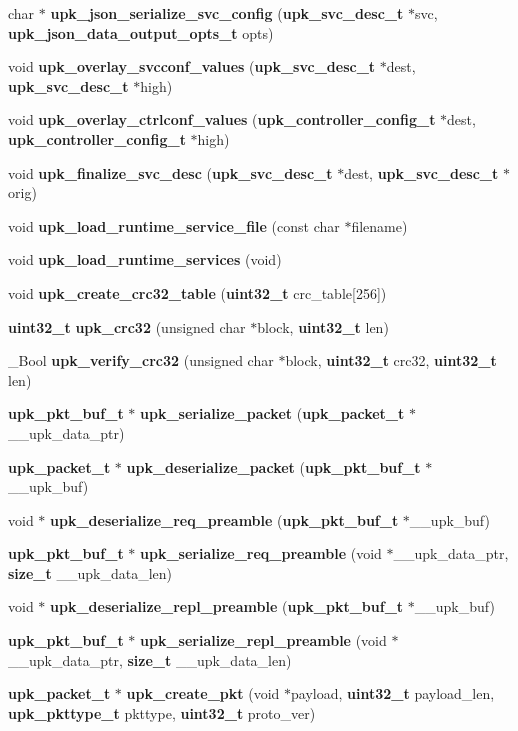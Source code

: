 \begin{DoxyCompactItemize}
\item 
char $\ast$ {\bf upk\_\-json\_\-serialize\_\-svc\_\-config} ({\bf upk\_\-svc\_\-desc\_\-t} $\ast$svc, {\bf upk\_\-json\_\-data\_\-output\_\-opts\_\-t} opts)
\item 
void {\bf upk\_\-overlay\_\-svcconf\_\-values} ({\bf upk\_\-svc\_\-desc\_\-t} $\ast$dest, {\bf upk\_\-svc\_\-desc\_\-t} $\ast$high)
\item 
void {\bf upk\_\-overlay\_\-ctrlconf\_\-values} ({\bf upk\_\-controller\_\-config\_\-t} $\ast$dest, {\bf upk\_\-controller\_\-config\_\-t} $\ast$high)
\item 
void {\bf upk\_\-finalize\_\-svc\_\-desc} ({\bf upk\_\-svc\_\-desc\_\-t} $\ast$dest, {\bf upk\_\-svc\_\-desc\_\-t} $\ast$orig)
\item 
void {\bf upk\_\-load\_\-runtime\_\-service\_\-file} (const char $\ast$filename)
\item 
void {\bf upk\_\-load\_\-runtime\_\-services} (void)
\item 
void {\bf upk\_\-create\_\-crc32\_\-table} ({\bf uint32\_\-t} crc\_\-table[256])
\item 
{\bf uint32\_\-t} {\bf upk\_\-crc32} (unsigned char $\ast$block, {\bf uint32\_\-t} len)
\item 
\_\-Bool {\bf upk\_\-verify\_\-crc32} (unsigned char $\ast$block, {\bf uint32\_\-t} crc32, {\bf uint32\_\-t} len)
\item 
{\bf upk\_\-pkt\_\-buf\_\-t} $\ast$ {\bf upk\_\-serialize\_\-packet} ({\bf upk\_\-packet\_\-t} $\ast$\_\-\_\-upk\_\-data\_\-ptr)
\item 
{\bf upk\_\-packet\_\-t} $\ast$ {\bf upk\_\-deserialize\_\-packet} ({\bf upk\_\-pkt\_\-buf\_\-t} $\ast$\_\-\_\-upk\_\-buf)
\item 
void $\ast$ {\bf upk\_\-deserialize\_\-req\_\-preamble} ({\bf upk\_\-pkt\_\-buf\_\-t} $\ast$\_\-\_\-upk\_\-buf)
\item 
{\bf upk\_\-pkt\_\-buf\_\-t} $\ast$ {\bf upk\_\-serialize\_\-req\_\-preamble} (void $\ast$\_\-\_\-upk\_\-data\_\-ptr, {\bf size\_\-t} \_\-\_\-upk\_\-data\_\-len)
\item 
void $\ast$ {\bf upk\_\-deserialize\_\-repl\_\-preamble} ({\bf upk\_\-pkt\_\-buf\_\-t} $\ast$\_\-\_\-upk\_\-buf)
\item 
{\bf upk\_\-pkt\_\-buf\_\-t} $\ast$ {\bf upk\_\-serialize\_\-repl\_\-preamble} (void $\ast$\_\-\_\-upk\_\-data\_\-ptr, {\bf size\_\-t} \_\-\_\-upk\_\-data\_\-len)
\item 
{\bf upk\_\-packet\_\-t} $\ast$ {\bf upk\_\-create\_\-pkt} (void $\ast$payload, {\bf uint32\_\-t} payload\_\-len, {\bf upk\_\-pkttype\_\-t} pkttype, {\bf uint32\_\-t} proto\_\-ver)

\end{DoxyCompactItemize}
